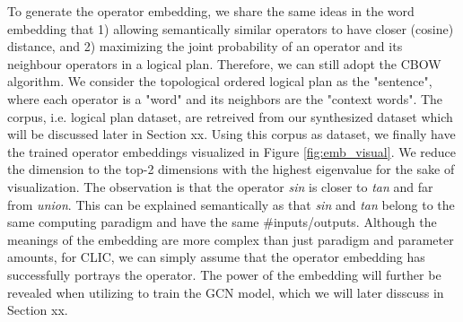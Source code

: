 To generate the operator embedding, we share the same ideas in the word embedding that
1) allowing semantically similar operators to have closer (cosine) distance, 
and 2) maximizing the joint probability of an operator and its neighbour operators in a logical plan.
Therefore, we can still adopt the CBOW algorithm.
We consider the topological ordered logical plan as the "sentence", where each operator is a "word" and its neighbors are the "context words". 
The corpus, i.e. logical plan dataset, are retreived from our synthesized dataset which will be discussed later in Section xx.
Using this corpus as dataset, we finally have the trained operator embeddings visualized in Figure \ref{fig:emb_visual}.
We reduce the dimension to the top-2 dimensions with the highest eigenvalue for the sake of visualization.
The observation is that the operator \textit{sin} is closer to \textit{tan} and far from \textit{union}.
This can be explained semantically as that \textit{sin} and \textit{tan} belong to the same computing paradigm and have the same \#inputs/outputs.
Although the meanings of the embedding are more complex than just paradigm and parameter amounts, 
for CLIC, 
we can simply assume that the operator embedding has successfully portrays the operator.
The power of the embedding will further be revealed when utilizing to train the GCN model, which we will later disscuss in Section xx.

